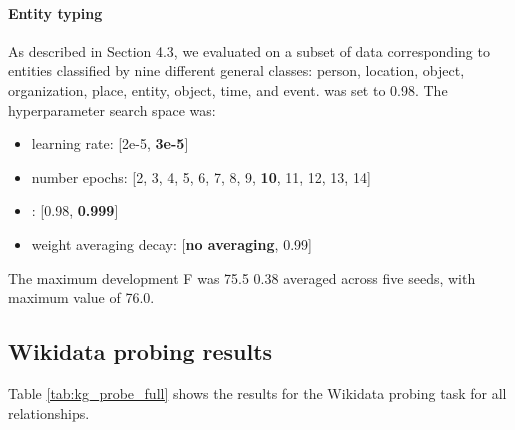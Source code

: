 \documentclass[11pt,a4paper]{article}
\begin{document}
\paragraph{Entity typing}
As described in Section 4.3, we evaluated on a subset of data corresponding to entities classified by nine different general classes: person, location, object, organization, place, entity, object, time, and event.
 was set to 0.98.
The hyperparameter search space was:
\begin{itemize}
    \item learning rate: [2e-5, \textbf{3e-5}]
    \item number epochs: [2, 3, 4, 5, 6, 7, 8, 9, \textbf{10}, 11, 12, 13, 14]
    \item : [0.98, \textbf{0.999}]
    \item weight averaging decay: [\textbf{no averaging}, 0.99]
\end{itemize}
The maximum development F was 75.5  0.38 averaged across five seeds, with maximum value of 76.0.



\subsection{Wikidata probing results}

Table \ref{tab:kg_probe_full} shows the results for the Wikidata probing task for all relationships.
\end{document}
